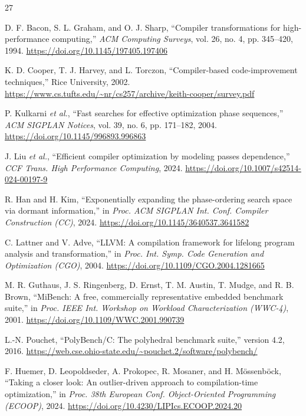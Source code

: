 \documentclass[conference,a4paper]{IEEEtran}
\begin{document}
\begin{thebibliography}{27}

D. F. Bacon, S. L. Graham, and O. J. Sharp,
``Compiler transformations for high-performance computing,''
\textit{ACM Computing Surveys}, vol. 26, no. 4, pp. 345--420, 1994.
\url{https://doi.org/10.1145/197405.197406}

K. D. Cooper, T. J. Harvey, and L. Torczon,
``Compiler-based code-improvement techniques,'' Rice University, 2002.
\url{https://www.cs.tufts.edu/~nr/cs257/archive/keith-cooper/survey.pdf}

P. Kulkarni \textit{et al.},
``Fast searches for effective optimization phase sequences,''
\textit{ACM SIGPLAN Notices}, vol. 39, no. 6, pp. 171--182, 2004.
\url{https://doi.org/10.1145/996893.996863}

J. Liu \textit{et al.},
``Efficient compiler optimization by modeling passes dependence,''
\textit{CCF Trans. High Performance Computing}, 2024.
\url{https://doi.org/10.1007/s42514-024-00197-9}

R. Han and H. Kim,
``Exponentially expanding the phase-ordering search space via dormant information,''
in \textit{Proc. ACM SIGPLAN Int. Conf. Compiler Construction (CC)}, 2024.
\url{https://doi.org/10.1145/3640537.3641582}

C. Lattner and V. Adve,
``LLVM: A compilation framework for lifelong program analysis and transformation,''
in \textit{Proc. Int. Symp. Code Generation and Optimization (CGO)}, 2004.
\url{https://doi.org/10.1109/CGO.2004.1281665}

M. R. Guthaus, J. S. Ringenberg, D. Ernst, T. M. Austin, T. Mudge, and R. B. Brown,
``MiBench: A free, commercially representative embedded benchmark suite,''
in \textit{Proc. IEEE Int. Workshop on Workload Characterization (WWC-4)}, 2001.
\url{https://doi.org/10.1109/WWC.2001.990739}

L.-N. Pouchet,
``PolyBench/C: The polyhedral benchmark suite,'' version 4.2, 2016.
\url{https://web.cse.ohio-state.edu/~pouchet.2/software/polybench/}

F. Huemer, D. Leopoldseder, A. Prokopec, R. Mosaner, and H. M\"ossenb\"ock,
``Taking a closer look: An outlier-driven approach to compilation-time optimization,''
in \textit{Proc. 38th European Conf. Object-Oriented Programming (ECOOP)}, 2024.
\url{https://doi.org/10.4230/LIPIcs.ECOOP.2024.20}


\end{thebibliography}
\end{document}
